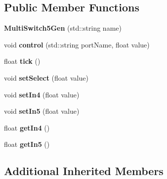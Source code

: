 \subsection*{Public Member Functions}
\begin{DoxyCompactItemize}
\item 
{\bfseries Multi\+Switch5\+Gen} (std\+::string name)\hypertarget{classunit_1_1MultiSwitch5Gen_a61feb713c9bf9e11cb7f8da0c27b8faf}{}\label{classunit_1_1MultiSwitch5Gen_a61feb713c9bf9e11cb7f8da0c27b8faf}

\item 
void {\bfseries control} (std\+::string port\+Name, float value)\hypertarget{classunit_1_1MultiSwitch5Gen_a22d5724ba74b064282da08c9600bed87}{}\label{classunit_1_1MultiSwitch5Gen_a22d5724ba74b064282da08c9600bed87}

\item 
float {\bfseries tick} ()\hypertarget{classunit_1_1MultiSwitch5Gen_a4c357bd87f34841ccfb6a95f9a820384}{}\label{classunit_1_1MultiSwitch5Gen_a4c357bd87f34841ccfb6a95f9a820384}

\item 
void {\bfseries set\+Select} (float value)\hypertarget{classunit_1_1MultiSwitch5Gen_ab2c8a47e7d29e01183a02d9fbf60f0ed}{}\label{classunit_1_1MultiSwitch5Gen_ab2c8a47e7d29e01183a02d9fbf60f0ed}

\item 
void {\bfseries set\+In4} (float value)\hypertarget{classunit_1_1MultiSwitch5Gen_a47554a04fc8a495a2ce60ae87460da8d}{}\label{classunit_1_1MultiSwitch5Gen_a47554a04fc8a495a2ce60ae87460da8d}

\item 
void {\bfseries set\+In5} (float value)\hypertarget{classunit_1_1MultiSwitch5Gen_a7073be5cc2e0383aecefdf54c9dec714}{}\label{classunit_1_1MultiSwitch5Gen_a7073be5cc2e0383aecefdf54c9dec714}

\item 
float {\bfseries get\+In4} ()\hypertarget{classunit_1_1MultiSwitch5Gen_a97d0f025afcb8b7b5167ccaf244fc9ed}{}\label{classunit_1_1MultiSwitch5Gen_a97d0f025afcb8b7b5167ccaf244fc9ed}

\item 
float {\bfseries get\+In5} ()\hypertarget{classunit_1_1MultiSwitch5Gen_a887395fd9475f73c70b385e3af731828}{}\label{classunit_1_1MultiSwitch5Gen_a887395fd9475f73c70b385e3af731828}

\end{DoxyCompactItemize}
\subsection*{Additional Inherited Members}


